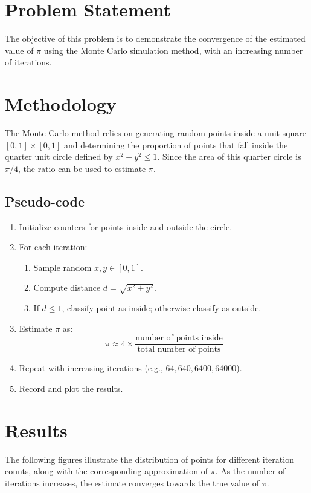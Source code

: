 \section*{Problem Statement}
The objective of this problem is to demonstrate the convergence of the estimated value of $\pi$ using the Monte Carlo simulation method, with an increasing number of iterations.

\section*{Methodology}
The Monte Carlo method relies on generating random points inside a unit square $[0,1] \times [0,1]$ and determining the proportion of points that fall inside the quarter unit circle defined by $x^2 + y^2 \leq 1$. Since the area of this quarter circle is $\pi/4$, the ratio can be used to estimate $\pi$.

\subsection*{Pseudo-code}
\begin{enumerate}
  \item Initialize counters for points inside and outside the circle.
  \item For each iteration:
  \begin{enumerate}
    \item Sample random $x, y \in [0,1]$.
    \item Compute distance $d = \sqrt{x^2 + y^2}$.
    \item If $d \leq 1$, classify point as inside; otherwise classify as outside.
  \end{enumerate}
  \item Estimate $\pi$ as:
  \[
    \pi \approx 4 \times \frac{\text{number of points inside}}{\text{total number of points}}
  \]
  \item Repeat with increasing iterations (e.g., $64, 640, 6400, 64000$).
  \item Record and plot the results.
\end{enumerate}

\section*{Results}
The following figures illustrate the distribution of points for different iteration counts, along with the corresponding approximation of $\pi$. As the number of iterations increases, the estimate converges towards the true value of $\pi$.

